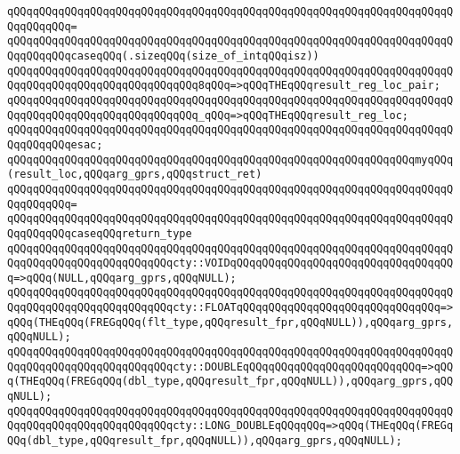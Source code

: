 \verb|qQQqqQQqqQQqqQQqqQQqqQQqqQQqqQQqqQQqqQQqqQQqqQQqqQQqqQQqqQQqqQQqqQQqqQQqqQQqqQQq=|\newline
\verb|qQQqqQQqqQQqqQQqqQQqqQQqqQQqqQQqqQQqqQQqqQQqqQQqqQQqqQQqqQQqqQQqqQQqqQQqqQQqqQQqcaseqQQq(.sizeqQQq(size_of_intqQQqisz))|\newline
\newline
\verb|qQQqqQQqqQQqqQQqqQQqqQQqqQQqqQQqqQQqqQQqqQQqqQQqqQQqqQQqqQQqqQQqqQQqqQQqqQQqqQQqqQQqqQQqqQQqqQQqqQQq8qQQq=>qQQqTHEqQQqresult_reg_loc_pair;|\newline
\verb|qQQqqQQqqQQqqQQqqQQqqQQqqQQqqQQqqQQqqQQqqQQqqQQqqQQqqQQqqQQqqQQqqQQqqQQqqQQqqQQqqQQqqQQqqQQqqQQqqQQq_qQQq=>qQQqTHEqQQqresult_reg_loc;|\newline
\verb|qQQqqQQqqQQqqQQqqQQqqQQqqQQqqQQqqQQqqQQqqQQqqQQqqQQqqQQqqQQqqQQqqQQqqQQqqQQqqQQqesac;|\newline
\newline
\newline
\verb|qQQqqQQqqQQqqQQqqQQqqQQqqQQqqQQqqQQqqQQqqQQqqQQqqQQqqQQqqQQqqQQqmyqQQq(result_loc,qQQqarg_gprs,qQQqstruct_ret)|\newline
\verb|qQQqqQQqqQQqqQQqqQQqqQQqqQQqqQQqqQQqqQQqqQQqqQQqqQQqqQQqqQQqqQQqqQQqqQQqqQQqqQQq=|\newline
\verb|qQQqqQQqqQQqqQQqqQQqqQQqqQQqqQQqqQQqqQQqqQQqqQQqqQQqqQQqqQQqqQQqqQQqqQQqqQQqqQQqcaseqQQqreturn_type|\newline
\newline
\verb|qQQqqQQqqQQqqQQqqQQqqQQqqQQqqQQqqQQqqQQqqQQqqQQqqQQqqQQqqQQqqQQqqQQqqQQqqQQqqQQqqQQqqQQqqQQqqQQqcty::VOIDqQQqqQQqqQQqqQQqqQQqqQQqqQQqqQQqqQQq=>qQQq(NULL,qQQqarg_gprs,qQQqNULL);|\newline
\newline
\verb|qQQqqQQqqQQqqQQqqQQqqQQqqQQqqQQqqQQqqQQqqQQqqQQqqQQqqQQqqQQqqQQqqQQqqQQqqQQqqQQqqQQqqQQqqQQqqQQqcty::FLOATqQQqqQQqqQQqqQQqqQQqqQQqqQQqqQQq=>qQQq(THEqQQq(FREGqQQq(flt_type,qQQqresult_fpr,qQQqNULL)),qQQqarg_gprs,qQQqNULL);|\newline
\verb|qQQqqQQqqQQqqQQqqQQqqQQqqQQqqQQqqQQqqQQqqQQqqQQqqQQqqQQqqQQqqQQqqQQqqQQqqQQqqQQqqQQqqQQqqQQqqQQqcty::DOUBLEqQQqqQQqqQQqqQQqqQQqqQQqqQQq=>qQQq(THEqQQq(FREGqQQq(dbl_type,qQQqresult_fpr,qQQqNULL)),qQQqarg_gprs,qQQqNULL);|\newline
\verb|qQQqqQQqqQQqqQQqqQQqqQQqqQQqqQQqqQQqqQQqqQQqqQQqqQQqqQQqqQQqqQQqqQQqqQQqqQQqqQQqqQQqqQQqqQQqqQQqcty::LONG_DOUBLEqQQqqQQq=>qQQq(THEqQQq(FREGqQQq(dbl_type,qQQqresult_fpr,qQQqNULL)),qQQqarg_gprs,qQQqNULL);|\newline
\newline
